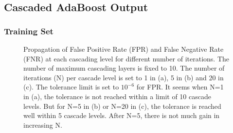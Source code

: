 \documentclass{article}
\begin{document}
\newpage
\subsection{Cascaded AdaBoost Output}
\subsubsection{Training Set}
\begin{figure}[!htbp]
     \centering
     \captionsetup[subfigure]{labelformat=empty}
    \caption{Propagation of False Positive Rate (FPR) and False Negative Rate (FNR) at each cascading level for different number of iterations. The number of maximum cascading layers is fixed to 10. The number of iterations (N) per cascade level is set to 1 in (a), 5 in (b) and 20 in (c). The tolerance limit is set to $10^{-6}$ for FPR. It seems when N=1 in (a), the tolerance is not reached within a limit of 10 cascade levels. But for N=5 in (b) or N=20 in (c), the tolerance is reached well within 5 cascade levels. After N=5, there is not much gain in increasing N.}
    \label{fig:adaboost_1}
\end{figure}
\end{document}
